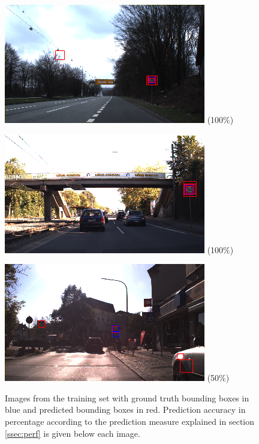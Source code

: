 \documentclass[12pt,a4paper,bibliography=totocnumbered,listof=totocnumbered]{scrartcl}
\begin{document}
\begin{figure}[H]
\begin{minipage}{0.3\textwidth}
\centering
\includegraphics[width=\linewidth]{train407_predboxes2.png}
\small{(100\%)}
\end{minipage}
\hfill
\begin{minipage}{0.3\textwidth}
\centering
\includegraphics[width=\linewidth]{train599_predboxes2.png}
\small{(100\%)}
\end{minipage}
\hfill
\begin{minipage}{0.3\textwidth}
\centering
\includegraphics[width=\linewidth]{train102_predboxes2.png}
\small{(50\%)}
\end{minipage}
\caption{Images from the training set with ground truth bounding boxes in blue and predicted bounding boxes in red. Prediction accuracy in percentage according to the prediction measure explained in section \ref{ssec:perf} is given below each image.}
\label{fig:train_img_bbox}
\end{figure}
\end{document}
